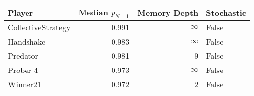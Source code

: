 \begin{tabular}{lrrl}
\toprule
             Player &  Median $p_{N-1}$ &  Memory Depth & Stochastic \\
\midrule
 CollectiveStrategy &             0.991 &            \(\infty\) &      False \\
          Handshake &             0.983 &            \(\infty\) &      False \\
           Predator &             0.981 &             9 &      False \\
           Prober 4 &             0.973 &            \(\infty\) &      False \\
           Winner21 &             0.972 &             2 &      False \\
\bottomrule
\end{tabular}
